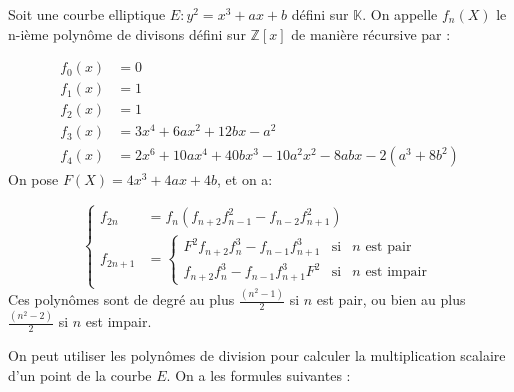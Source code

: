 \documentclass[12pt]{article}
\begin{document}
\begin{defi}
Soit une courbe elliptique $E : y^2 = x^3 + ax+b$ défini sur $\mathbb{K}$. On appelle $f_n(X)$ le n-ième polynôme de divisons défini sur $\mathbb{Z}[x]$ de manière récursive par : 


\begin{align*}
f_0(x) &= 0 \\
f_1(x) &= 1 \\
f_2(x) &= 1 \\
f_3(x) &= 3x^4 + 6ax^2 +12bx - a^2 \\
f_4(x) &= 2x^6 + 10ax^4 +40bx^3 - 10a^2x^2 - 8abx - 2(a^3 + 8b^2)
\end{align*}
On pose $F(X)= 4x^3 + 4ax + 4b$, et on a:

\begin{equation}
\left\lbrace
\begin{array}{ll}
f_{2n}& =  f_n(f_{n+2}f_{n-1}^2 - f_{n-2}f_{n+1}^2)   \\
f_{2n+1}& = \left\lbrace 
\begin{array}{ccc}
F^2f_{n+2}f_n^3 - f_{n-1}f_{n+1}^3 & \mbox{si} & n \text{ est pair}\\
f_{n+2}f_n^3 - f_{n-1}f_{n+1}^3F^2 & \mbox{si} & n \text{ est impair} \end{array}\right.

\end{array} \right.
\end{equation} 
Ces polynômes sont de degré au plus $\frac{(n^2 -1)}{2}$ si $n$ est pair, ou bien  au plus $\frac{(n^2 -2)}{2}$ si $n$ est impair.
\end{defi}


On peut utiliser les polynômes de division pour calculer la multiplication scalaire d'un point de la courbe $E$.
On a les formules suivantes : 
\end{document}
